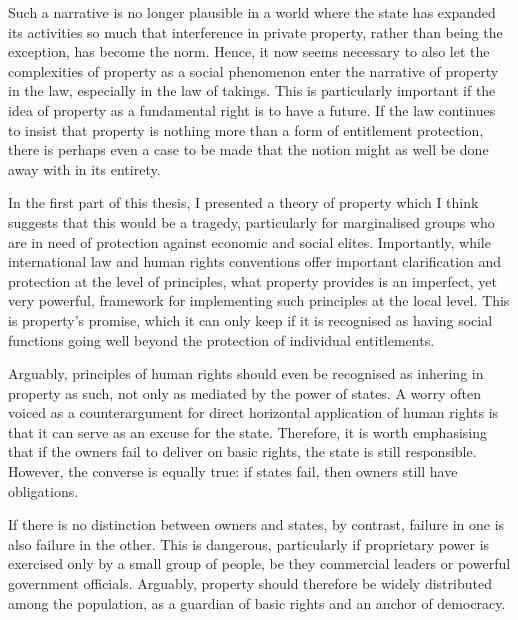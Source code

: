 Such a narrative is no longer plausible in a world where the state has expanded its activities so much that interference in private property, rather than being the exception, has become the norm. Hence, it now seems necessary to also let the complexities of property as a social phenomenon enter the narrative of property in the law, especially in the law of takings. This is particularly important if the idea of property as a fundamental right is to have a future. If the law continues to insist that property is nothing more than a form of entitlement protection, there is perhaps even a case to be made that the notion might as well be done away with in its entirety.

In the first part of this thesis, I presented a theory of property which I think suggests that this would be a tragedy, particularly for marginalised groups who are in need of protection against economic and social elites. Importantly, while international law and human rights conventions offer important clarification and protection at the level of principles, what property provides is an imperfect, yet very powerful, framework for implementing such principles at the local level. This is property's promise, which it can only keep if it is recognised as having social functions going well beyond the protection of individual entitlements.

Arguably, principles of human rights should even be recognised as inhering in property as such, not only as mediated by the power of states. A worry often voiced as a counterargument for direct horizontal application of human rights is that it can serve as an excuse for the state. Therefore, it is worth emphasising that if the owners fail to deliver on basic rights, the state is still responsible. However, the converse is equally true: if states fail, then owners still have obligations. 

If there is no distinction between owners and states, by contrast, failure in one is also failure in the other. This is dangerous, particularly if proprietary power is exercised only by a small group of people, be they commercial leaders or powerful government officials. Arguably, property should therefore be widely distributed among the population, as a guardian of basic rights and an anchor of democracy.
 
